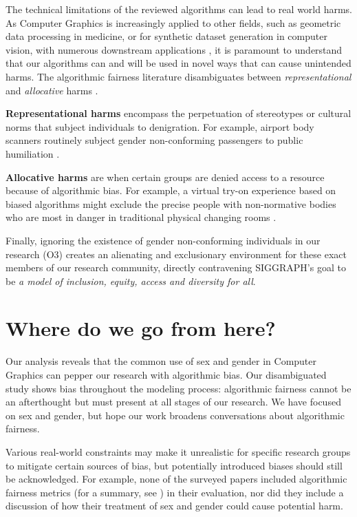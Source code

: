 \documentclass[sigconf,balance=false]{acmart}
\begin{document}
The technical limitations of the reviewed algorithms can lead to real world harms. As Computer Graphics is increasingly applied to other fields, such as geometric data processing in medicine, or for synthetic dataset generation in computer vision, with numerous downstream applications \cite{cars, chen2021synthetic, dhs}, it is paramount to understand that our algorithms can and will be used in novel ways that can cause unintended harms. The algorithmic fairness literature disambiguates between {\em representational} and {\em allocative} harms \cite{barocas-hardt-narayanan}.

{\bf Representational harms} encompass the perpetuation of stereotypes or cultural norms that subject individuals to denigration. For example, airport body scanners routinely subject gender non-conforming passengers to public humiliation \cite{tsa}.

{\bf Allocative harms} are when certain groups are denied access to a resource because of algorithmic bias. For example, a virtual try-on experience based on biased algorithms might exclude the precise people with non-normative bodies who are most in danger in traditional physical changing rooms \cite{changingroom}.

Finally, ignoring the existence of gender non-conforming individuals in our research (O3) creates an alienating and exclusionary environment for these exact members of our research community, directly contravening SIGGRAPH's goal to be \emph{a model of inclusion, equity, access and diversity for all}.

\section{Where do we go from here?}

Our analysis reveals that the common use of sex and gender in Computer Graphics can pepper our research with algorithmic bias. Our disambiguated study shows bias throughout the modeling process: algorithmic fairness cannot be an afterthought but must present at all stages of our research. We have focused on sex and gender, but hope our work broadens conversations about algorithmic fairness.%

Various real-world constraints may make it unrealistic for specific research groups to mitigate certain sources of bias, but potentially introduced biases should still be acknowledged. For example, none of the surveyed papers included algorithmic fairness metrics (for a summary, see \cite{fairnesssurvey, fairnessmetrics}) in their evaluation, nor did they include a discussion of how their treatment of sex and gender could cause potential harm.
\end{document}
